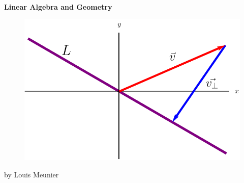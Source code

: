 \documentclass[12pt]{article}
\begin{document}
\newcommand{\red}[1]{\textcolor{red}{#1}}
\newcommand{\ddx}{\frac{d}{dx}}
\newcommand{\ddy}{\frac{d}{dy}}
\newcommand{\dxdy}{\frac{dx}{dy}}
\newcommand{\dydx}{\frac{dy}{dx}}

\newcommand{\real}{\mathbb{R}}
\newcommand{\naturals}{\mathbb{N}}
\newcommand{\integers}{\mathbb{Z}}
\newcommand{\rational}{\mathbb{Q}}
\newcommand{\complex}{\mathbb{C}}

\newcommand{\twodmatrix}[2]{\begin{bmatrix}
#1\\
#2\\
\end{bmatrix}}
\newcommand{\twobytwomatrix}[4]{\begin{bmatrix}
#1 &#2\\
#3 &#4\\
\end{bmatrix}}

\hypersetup{
    linkcolor=violet
}

\begin{titlepage}
    \begin{center}
        \vspace*{1cm}
        \Huge
        \textbf{Linear Algebra and Geometry}
        
        \vfill
        
        \begin{figure}[!ht]
            \centering
            \includegraphics{misc/titlepage.png}
        \end{figure}
        \vfill
        
        \small
        by Louis Meunier
        
        \href{https://notes.louismeunier.net}{\color{violet}{notes.louismeunier.net}}
        
    \end{center}
\end{titlepage}
\end{document}
